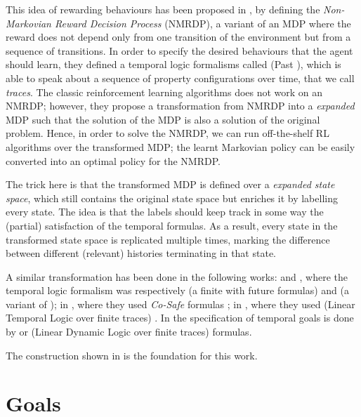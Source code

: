 \medskip

This idea of rewarding behaviours has been proposed in \citep{bacchus1996rewarding}, by defining the \emph{Non-Markovian Reward Decision Process} (NMRDP), a variant of an MDP where the reward does not depend only from one transition of the environment but from a sequence of transitions. In order to specify the desired behaviours that the agent should learn, they defined a temporal logic formalisms called \PLTL (Past \LTL), which is able to speak about a sequence of property configurations over time, that we call \emph{traces}. The classic reinforcement learning algorithms does not work on an NMRDP; however, they propose a transformation from NMRDP into a \emph{expanded} MDP such that the solution of the MDP is also a solution of the original problem. Hence, in order to solve the NMRDP, we can run off-the-shelf RL algorithms over the transformed MDP; the learnt Markovian policy can be easily converted into an optimal policy for the NMRDP.

The trick here is that the transformed MDP is defined over a \emph{expanded state space}, which still contains the original state space but enriches it by labelling every state. The idea is that the labels should keep track in some way the (partial) satisfaction of the temporal formulas. As a result, every state in the transformed state space is replicated multiple times, marking the difference between different (relevant) histories terminating in that state.

\medskip
A similar transformation has been done in the following works: 
\citep{ThiebauxGSPK06} and \citep{gretton2014more}, where the temporal logic formalism was respectively \FLTL (a finite \LTL with future formulas) and \FstarLTL (a variant of \FLTL); 
in \citep{icarte2018teaching}, where they used \emph{Co-Safe} \LTL formulas \citep{Kupferman:2001:MCS:569028.569032, Lacerda:2015:OPG:2832415.2832470};
in \citep{CamachoCSM17, CamachoCSM17b}, where they used \LTLf (Linear Temporal Logic over finite traces) \citep{de2013linear}.
In \citep{AAAI1817342} the specification of temporal goals is done by \LTLf or \LDLf (Linear Dynamic Logic over finite traces) formulas.

The construction shown in \citep{AAAI1817342} is the foundation for this work.


\section{Goals}\label{sect:intro-goals}

